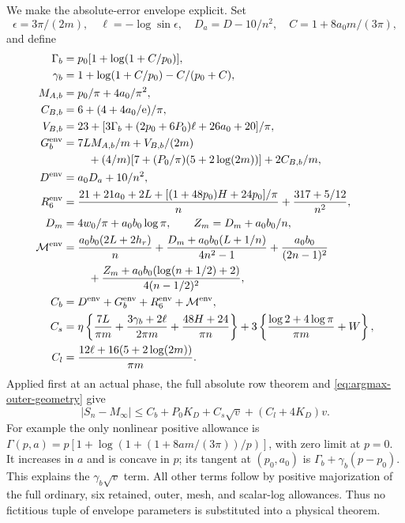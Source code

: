 We make the absolute-error envelope explicit.  Set
\[
 \epsilon=3\pi/(2m),\quad\ell=-\log\sin\epsilon,\quad
 D_a=D-10/n^2,\quad C=1+8a_0m/(3\pi),
\]
and define
\begin{align*}
 \Gamma_b&=p_0[1+\log(1+C/p_0)],\\
 \gamma_b&=1+\log(1+C/p_0)-C/(p_0+C),\\
 M_{A,b}&=p_0/\pi+4a_0/\pi^2,\\
 C_{B,b}&=6+(4+4a_0/\mathrm e)/\pi,\\
 V_{B,b}&=23+[3\Gamma_b+(2p_0+6P_0)\ell+26a_0+20]/\pi,\\
 G_b^{\rm env}&=7LM_{A,b}/m+V_{B,b}/(2m)\\
 &\hspace{8mm}+(4/m)[7+(P_0/\pi)(5+2\log(2m))]+2C_{B,b}/m,\\
 D^{\rm env}&=a_0D_a+10/n^2,\\
 R_6^{\rm env}&=\frac{21+21a_0+2L+[(1+48p_0)H+24p_0]/\pi}{n}
                                    +\frac{317+5/12}{n^2},\\
 D_m&=4w_0/\pi+a_0b_0\log\pi,\qquad Z_m=D_m+a_0b_0/n,\\
 \mathcal M^{\rm env}&=\frac{a_0b_0(2L+2h_r)}n
  +\frac{D_m+a_0b_0(L+1/n)}{4n^2-1}+\frac{a_0b_0}{(2n-1)^2}\\
 &\hspace{8mm}+\frac{Z_m+a_0b_0(\log(n+1/2)+2)}{4(n-1/2)^2},\\
 C_b&=D^{\rm env}+G_b^{\rm env}+R_6^{\rm env}+\mathcal M^{\rm env},\\
 C_s&=\eta\left\{\frac{7L}{\pi m}
      +\frac{3\gamma_b+2\ell}{2\pi m}+\frac{48H+24}{\pi n}\right\}
                    +3\left\{\frac{\log2+4\log\pi}{\pi m}+W\right\},\\
 C_l&=\frac{12\ell+16(5+2\log(2m))}{\pi m}.
\end{align*}
Applied first at an actual phase, the full absolute row theorem and
\eqref{eq:argmax-outer-geometry} give
\begin{equation}
 |S_n-M_\infty|\leq C_b+P_0K_D+C_s\sqrt v+(C_l+4K_D)v.
                                                        \label{eq:argmax-outer-error}
\end{equation}
For example the only nonlinear positive allowance is
$\Gamma(p,a)=p[1+\log(1+(1+8am/(3\pi))/p)]$, with zero limit at
$p=0$.  It increases in $a$ and is concave in $p$; its tangent at
$(p_0,a_0)$ is $\Gamma_b+\gamma_b(p-p_0)$.
This explains the $\gamma_b\sqrt v$ term.  All other terms follow by
positive majorization of the full ordinary, six retained, outer,
mesh, and scalar-log allowances.  Thus no fictitious tuple of envelope
parameters is substituted into a physical theorem.

